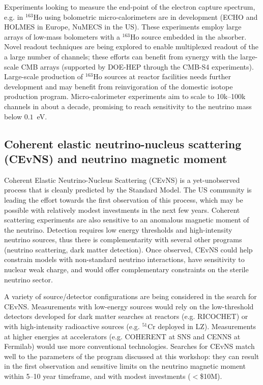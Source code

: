 Experiments looking to measure the end-point of the electron capture
spectrum, e.g. in $^{163}$Ho using bolometric micro-calorimeters are
in development (ECHO and HOLMES in Europe, NuMECS in the US). These
experiments employ large arrays of low-mass bolometers with a
$^{163}$Ho source embedded in the absorber. Novel readout techniques
are being explored to enable multiplexed readout of the a large number
of channels; these efforts can benefit from synergy with the
large-scale CMB arrays (supported by DOE-HEP through the CMB-S4
experiments). Large-scale production of $^{163}$Ho sources at reactor
facilities needs further  development and may benefit from
reinvigoration of the domestic isotope production program. 
Micro-calorimeter experiments aim to scale to 10k--100k
channels in about a decade, promising to reach sensitivity to the
neutrino mass below $0.1$~eV.


\subsection{Coherent elastic neutrino-nucleus scattering (CEvNS)
  and neutrino magnetic moment}

Coherent Elastic Neutrino-Nucleus Scattering (CEvNS) is a yet-unobserved
process that is cleanly predicted by the Standard Model.  The US
community is leading the effort towards the first observation of this
process, which may be possible with relatively modest investments in
the next few years. Coherent scattering experiments are also
sensitive to an anomalous magnetic moment of the neutrino. Detection
requires low energy thresholds and high-intensity neutrino sources,
thus there is complementarity with several other programs (neutrino
scattering, dark matter detection). Once observed, CEvNS could help
constrain models with non-standard neutrino interactions, have
sensitivity to nuclear weak charge, and would offer complementary
constraints on the sterile neutrino sector. 

A variety of source/detector configurations are being considered in the
search for CEvNS. Measurements with low-energy sources would rely
on the low-threshold detectors developed for dark matter searches at
reactors (e.g. RICOCHET) or with high-intensity radioactive
sources (e.g. $^{51}$Cr deployed in LZ). Measurements at higher
energies at accelerators (e.g. COHERENT at SNS and CENNS at Fermilab)
would use more conventional technologies. Searches for CEvNS match
well to the parameters of the program discussed at this workshop: they
can result in the first observation and sensitive limits on the
neutrino magnetic moment within 5--10 year timeframe, and with modest
investments ($<$\$10M). 

